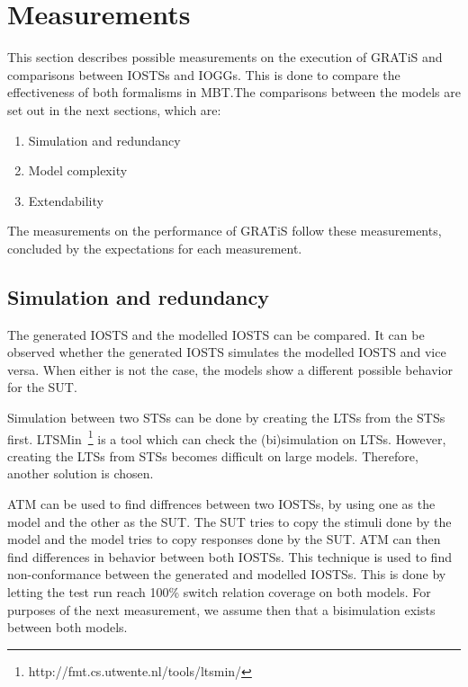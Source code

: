\section{Measurements}\label{sec:measurements}
This section describes possible measurements on the execution of GRATiS and comparisons between IOSTSs and IOGGs. This is done to compare the effectiveness of both formalisms in MBT.The comparisons between the models are set out in the next sections, which are:
\begin{enumerate}
\item Simulation and redundancy
\item Model complexity
\item Extendability
\end{enumerate}
The measurements on the performance of GRATiS follow these measurements, concluded by the expectations for each measurement.

\subsection{Simulation and redundancy}
The generated IOSTS and the modelled IOSTS can be compared. It can be observed whether the generated IOSTS simulates the modelled IOSTS and vice versa. When either is not the case, the models show a different possible behavior for the SUT.

Simulation between two STSs can be done by creating the LTSs from the STSs first. LTSMin~\footnote{http://fmt.cs.utwente.nl/tools/ltsmin/} is a tool which can check the (bi)simulation on LTSs. However, creating the LTSs from STSs becomes difficult on large models. Therefore, another solution is chosen.

ATM can be used to find diffrences between two IOSTSs, by using one as the model and the other as the SUT. The SUT tries to copy the stimuli done by the model and the model tries to copy responses done by the SUT. ATM can then find differences in behavior between both IOSTSs. This technique is used to find non-conformance between the generated and modelled IOSTSs. This is done by letting the test run reach 100\% switch relation coverage on both models. For purposes of the next measurement, we assume then that a bisimulation exists between both models.

